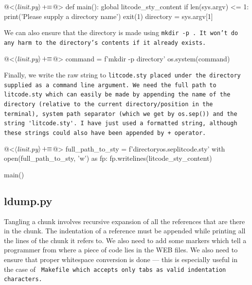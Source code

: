\begin{oldcode}
@<$\langle$\textit{linit.py}$\rangle \thinspace +\!\!\equiv$@>
def main():
    global litcode_sty_content
    if len(sys.argv) <= 1:
        print('Please supply a directory name')
        exit(1)
    directory = sys.argv[1]
\end{oldcode}

We can also ensure that the directory is made using \tt mkdir -p \rm. It won't do any harm to the directory's
contents if it already exists.

\begin{oldcode}
@<$\langle$\textit{linit.py}$\rangle \thinspace +\!\!\equiv$@>
    command = f'mkdir -p {directory}'
    os.system(command)
\end{oldcode}

Finally, we write the raw string to \tt litcode.sty \rm placed under the directory supplied as a command line
argument. We need the full path to \tt litcode.sty \rm which can easily be made by appending the name of the
directory (relative to the current directory/position in the terminal), system path separator (which we get by
\tt os.sep()\rm) and the string \verb|'litcode.sty'|. I have just used a formatted string, although these
strings could also have been appended by \tt + \rm operator.

\begin{oldcode}
@<$\langle$\textit{linit.py}$\rangle \thinspace +\!\!\equiv$@>
    full_path_to_sty = f'{directory}{os.sep}litcode.sty'
    with open(full_path_to_sty, 'w') as fp:
        fp.writelines(litcode_sty_content)

main()
\end{oldcode}

\subsection{ldump.py}

Tangling a chunk involves recursive expansion of all the references that are there in the chunk. The
indentation of a reference must be appended while printing all the lines of the chunk it refers to. We also
need to add some markers which tell a programmer from where a piece of code lies in the WEB files. We also
need to ensure that proper whitespace conversion is done --- this is especially useful in the case of \tt
Makefile \rm which accepts only tabs as valid indentation characters.\\

